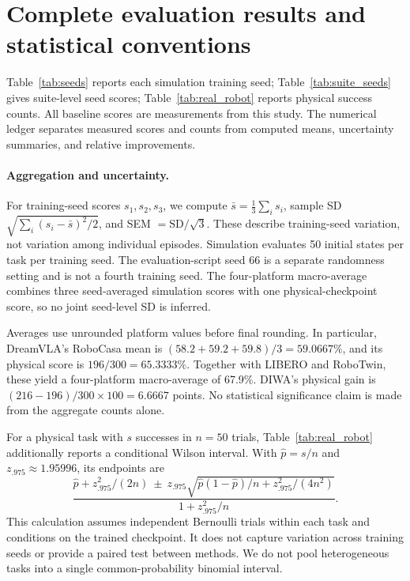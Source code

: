 \documentclass{article}
\begin{document}
\section{Complete evaluation results and statistical conventions}
\label{app:results}
Table~\ref{tab:seeds} reports each simulation training seed; Table~\ref{tab:suite_seeds} gives suite-level seed scores; Table~\ref{tab:real_robot} reports physical success counts. All baseline scores are measurements from this study. The numerical ledger separates measured scores and counts from computed means, uncertainty summaries, and relative improvements.

\paragraph{Aggregation and uncertainty.}
For training-seed scores $s_1,s_2,s_3$, we compute $\bar s=\frac13\sum_i s_i$, sample SD $\sqrt{\sum_i(s_i-\bar s)^2/2}$, and SEM $=\mathrm{SD}/\sqrt{3}$. These describe training-seed variation, not variation among individual episodes. Simulation evaluates 50 initial states per task per training seed. The evaluation-script seed 66 is a separate randomness setting and is not a fourth training seed. The four-platform macro-average combines three seed-averaged simulation scores with one physical-checkpoint score, so no joint seed-level SD is inferred.

Averages use unrounded platform values before final rounding. In particular, DreamVLA's RoboCasa mean is $(58.2+59.2+59.8)/3=59.0667\%$, and its physical score is $196/300=65.3333\%$. Together with LIBERO and RoboTwin, these yield a four-platform macro-average of 67.9\%. DIWA's physical gain is $(216-196)/300\times100=6.6667$ points. No statistical significance claim is made from the aggregate counts alone.

For a physical task with $s$ successes in $n=50$ trials, Table~\ref{tab:real_robot} additionally reports a conditional Wilson interval. With $\widehat p=s/n$ and $z_{.975}\approx1.95996$, its endpoints are
\begin{equation}
\frac{\widehat p+z_{.975}^2/(2n)\ \pm\ z_{.975}
\sqrt{\widehat p(1-\widehat p)/n+z_{.975}^2/(4n^2)}}{1+z_{.975}^2/n}.
\end{equation}
This calculation assumes independent Bernoulli trials within each task and conditions on the trained checkpoint. It does not capture variation across training seeds or provide a paired test between methods. We do not pool heterogeneous tasks into a single common-probability binomial interval.
\end{document}
